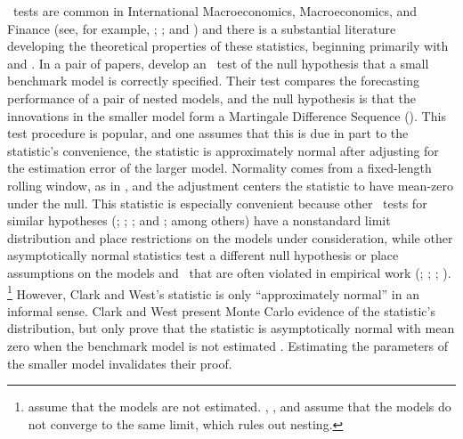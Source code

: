 \documentclass[12pt,fleqn]{article}
\begin{document}
\oos\ tests are common in International Macroeconomics,
Macroeconomics, and Finance (see, for example, \citealt{MeR:83};
\citealt{StW:03}; and \citealt{GoW:08}) and there is a substantial
literature developing the theoretical properties of these statistics,
beginning primarily with \citet{DiM:95} and
\citet{Wes:96}.
In a pair of papers,
\citet{ClW:06,ClW:07} develop an \oos\ test of the null hypothesis
that a small benchmark model is correctly specified.  Their test
compares the forecasting performance of a pair of nested models, and
the null hypothesis is that the innovations in the smaller model form
a Martingale Difference Sequence (\mds).  This test procedure is popular, and
one assumes that this is due in part to the statistic's convenience,
the statistic is approximately normal after adjusting for the
estimation error of the larger model.  Normality comes from a
fixed-length rolling window, as in \citet{GiW:06}, and the adjustment
centers the statistic to have mean-zero under the null.  This statistic is especially
convenient because other \oos\ tests for similar hypotheses
(\citealt{CCS:01}; \citealt{ClM:01,ClM:05}; \citealt{CoS:02,CoS:04};
and \citealt{Mcc:07}; among others) have a nonstandard limit
distribution and place restrictions on the models under consideration,
while other asymptotically normal statistics test a different null
hypothesis \citep{GiW:06} or place assumptions on the models and \dgp\
that are often violated in empirical work (\citealt{DiM:95};
\citealt{Wes:96}; \citealt{WeM:98};
\citealt{Mcc:00}).%
\footnote{\citet{DiM:95} assume that the models are
  not estimated. \citet{Wes:96}, \citet{WeM:98}, and \citet{Mcc:00}
  assume that the models do not converge to the same limit,
  which rules out nesting.} %
However, Clark and West's statistic is only ``approximately normal''
in an informal sense.  Clark and West present Monte Carlo evidence of
the statistic's distribution, but only prove that the statistic is
asymptotically normal with mean zero when the benchmark model is
not estimated \citep{ClW:06}. Estimating the parameters of the smaller
model invalidates their proof.
\end{document}
